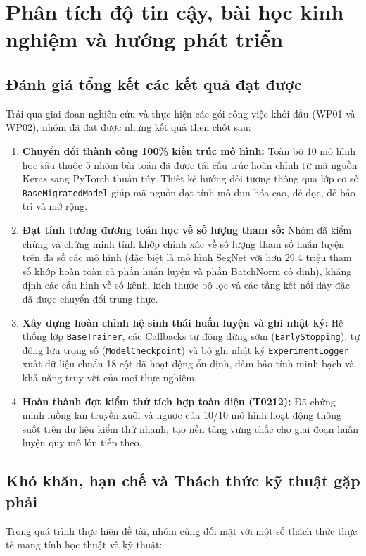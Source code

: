 \chapter{Phân tích độ tin cậy, bài học kinh nghiệm và hướng phát triển}

\section{Đánh giá tổng kết các kết quả đạt được}
Trải qua giai đoạn nghiên cứu và thực hiện các gói công việc khởi đầu (WP01 và WP02), nhóm đã đạt được những kết quả then chốt sau:

\begin{enumerate}
\item \textbf{Chuyển đổi thành công 100\% kiến trúc mô hình:} Toàn bộ 10 mô hình học sâu thuộc 5 nhóm bài toán đã được tái cấu trúc hoàn chỉnh từ mã nguồn Keras sang PyTorch thuần túy. Thiết kế hướng đối tượng thông qua lớp cơ sở \texttt{BaseMigratedModel} giúp mã nguồn đạt tính mô-đun hóa cao, dễ đọc, dễ bảo trì và mở rộng.
\item \textbf{Đạt tính tương đương toán học về số lượng tham số:} Nhóm đã kiểm chứng và chứng minh tính khớp chính xác về số lượng tham số huấn luyện trên đa số các mô hình (đặc biệt là mô hình SegNet với hơn 29.4 triệu tham số khớp hoàn toàn cả phần huấn luyện và phần BatchNorm cố định), khẳng định các cấu hình về số kênh, kích thước bộ lọc và các tầng kết nối dày đặc đã được chuyển đổi trung thực.
\item \textbf{Xây dựng hoàn chỉnh hệ sinh thái huấn luyện và ghi nhật ký:} Hệ thống lớp \texttt{BaseTrainer}, các Callbacks tự động dừng sớm (\texttt{EarlyStopping}), tự động lưu trọng số (\texttt{ModelCheckpoint}) và bộ ghi nhật ký \texttt{ExperimentLogger} xuất dữ liệu chuẩn 18 cột đã hoạt động ổn định, đảm bảo tính minh bạch và khả năng truy vết của mọi thực nghiệm.
\item \textbf{Hoàn thành đợt kiểm thử tích hợp toàn diện (T0212):} Đã chứng minh luồng lan truyền xuôi và ngược của 10/10 mô hình hoạt động thông suốt trên dữ liệu kiểm thử nhanh, tạo nền tảng vững chắc cho giai đoạn huấn luyện quy mô lớn tiếp theo.
\end{enumerate}

\section{Khó khăn, hạn chế và Thách thức kỹ thuật gặp phải}
Trong quá trình thực hiện đề tài, nhóm cũng đối mặt với một số thách thức thực tế mang tính học thuật và kỹ thuật:

